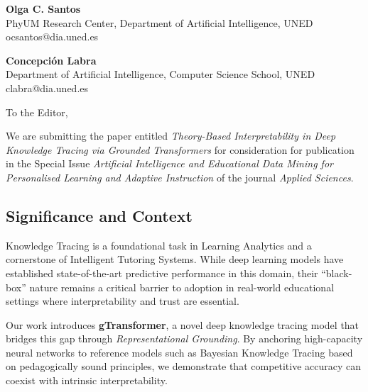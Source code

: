 \documentclass[10pt]{article}
\begin{document}
\begin{raggedright}

\textbf{Olga C. Santos} \\
PhyUM Research Center, Department of Artificial Intelligence, UNED \\
ocsantos@dia.uned.es \\

\vspace{0.2cm}

\textbf{Concepción Labra} \\
Department of Artificial Intelligence, Computer Science School, UNED \\
clabra@dia.uned.es \\

\end{raggedright}

\vspace{0.4cm}

\noindent
To the Editor,

\vspace{0.4cm}

\noindent

We are submitting the paper entitled \textit{Theory-Based Interpretability in Deep Knowledge Tracing via Grounded Transformers} for consideration for publication in the Special Issue \textit{Artificial Intelligence and Educational Data Mining for Personalised Learning and Adaptive Instruction} of the journal \textit{Applied Sciences}.

\subsection*{Significance and Context}
Knowledge Tracing is a foundational task in Learning Analytics and a cornerstone of Intelligent Tutoring Systems. While deep learning models have established state-of-the-art predictive performance in this domain, their ``black-box'' nature remains a critical barrier to adoption in real-world educational settings where interpretability and trust are essential. 

Our work introduces \textbf{gTransformer}, a novel deep knowledge tracing model that bridges this gap through \textit{Representational Grounding}. By anchoring high-capacity neural networks to reference models such as Bayesian Knowledge Tracing based on pedagogically sound principles, we demonstrate that competitive accuracy can coexist with intrinsic interpretability.
\end{document}
